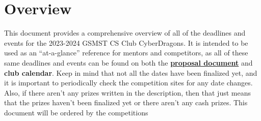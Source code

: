 \documentclass[
  letterpaper,
  DIV=11,
  numbers=noendperiod]{scrartcl}
\renewcommand*\contentsname{Table of contents}
\newcommand\contentsname{Table of contents}
\begin{document}
\renewcommand*\contentsname{Table of Contents}
{
\hypersetup{linkcolor=}
\setcounter{tocdepth}{6}
\tableofcontents
}
\tableofcontents
{}
\newpage{}

\hypertarget{overview}{%
\section{Overview}\label{overview}}

This document provides a comprehensive overview of all of the deadlines
and events for the 2023-2024 GSMST CS Club CyberDragons. It is intended
to be used as an ``at-a-glance'' reference for mentors and competitors,
as all of these same deadlines and events can be found on both the
\href{https://drive.google.com/file/d/1m0VGlUpv1V3IJLBle5qOZae0BnPgdrRq/view?usp=sharing}{\textbf{proposal
document}} and \textbf{club calendar}. Keep in mind that not all the
dates have been finalized yet, and it is important to periodically check
the competition sites for any date changes. Also, if there aren't any
prizes written in the description, then that just means that the prizes
haven't been finalized yet or there aren't any cash prizes. This
document will be ordered by the competitions
\end{document}
